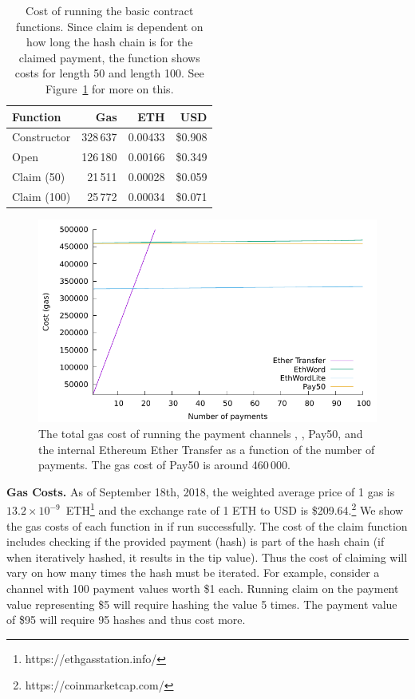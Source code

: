 \begin{table}[t]          
\centering
\begin{tabular}{ l | r | r | r }
Function & Gas & ETH & USD \\ \hline
Constructor 		&328\,637  	& 0.00433 	& \$0.908 \\
Open 			&126\,180 		& 0.00166 	& \$0.349 \\ 
Claim (50) 		&21\,511  	& 0.00028 	& \$0.059 \\
Claim (100) 		&25\,772  	& 0.00034 	& \$0.071 \\ 
\end{tabular}
\setlength{\belowcaptionskip}{-5pt}
\caption{Cost of running the basic contract functions. Since claim is dependent on how long the hash chain is for the claimed payment, the function shows costs for length 50 and length 100. See Figure~\ref{fig:gas} for more on this.\label{table:gas}}
\end{table}

\begin{figure}[t]
\centering

\includegraphics[width=0.6\linewidth]{figures/gas.pdf}
\setlength{\belowcaptionskip}{-10pt}
\caption{The total gas cost of running the payment channels \ew, \eww, \textsf{Pay50}, and the internal Ethereum Ether Transfer as a function of the number of payments. The gas cost of \textsf{Pay50} is around 460\,000.\label{fig:gas}}
	
\end{figure}

\textbf{Gas Costs.} As of September 18th, 2018, the weighted average price of 1 gas is $13.2\times10^{-9}$~ETH\footnote{https://ethgasstation.info/} and the exchange rate of 1 ETH to USD is \$209.64.\footnote{https://coinmarketcap.com/} We show the gas costs of each function in \ew if run successfully. The cost of the claim function includes checking if the provided payment (hash) is part of the hash chain (if when iteratively hashed, it results in the tip value). Thus the cost of claiming will vary on how many times the hash must be iterated. For example, consider a channel with 100 payment values worth \$1 each. Running claim on the payment value representing \$5 will require hashing the value 5 times. The payment value of \$95 will require 95 hashes and thus cost more. 

